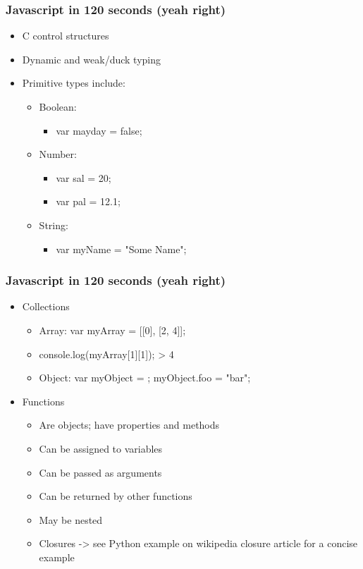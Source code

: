\documentclass{beamer}
\begin{document}
\begin{frame}
    \frametitle{Javascript in 120 seconds (yeah right)}
    \begin{itemize}
    \item C control structures
    \item Dynamic and weak/duck typing
    \item Primitive types include:
        \begin{itemize}
        \item Boolean: 
            \begin{itemize}
            \item var mayday = false;
            \end{itemize}
        \item Number: 
            \begin{itemize}
            \item var sal = 20; 
            \item var pal = 12.1;
            \end{itemize}
        \item String: 
            \begin{itemize}
            \item var myName = "Some Name";
            \end{itemize}
        \end{itemize}
    \end{itemize}
\end{frame}


\begin{frame}
    \frametitle{Javascript in 120 seconds (yeah right)}
    \begin{itemize}
    \item Collections
        \begin{itemize}
        \item Array: var myArray = [[0], [2, 4]]; 
        \item console.log(myArray[1][1]); > 4
        \item Object: var myObject = {}; myObject.foo = "bar";
        \end{itemize}
    \item Functions
        \begin{itemize}
        \item Are objects; have properties and methods
        \item Can be assigned to variables
        \item Can be passed as arguments
        \item Can be returned by other functions
        \item May be nested
        \item Closures -> see Python example on wikipedia closure article for a concise example
        \end{itemize}
    \end{itemize}
\end{frame}
\end{document}
